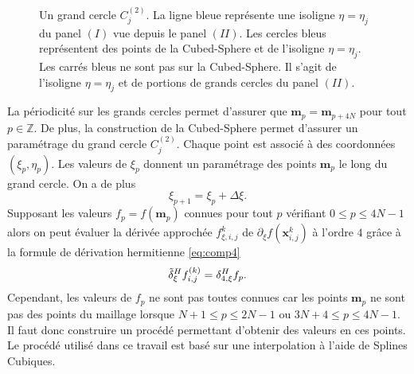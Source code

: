 \begin{figure}[htbp]
\begin{center}
\end{center}
\caption{Un grand cercle $C_j^{(2)}$. La ligne bleue représente une isoligne $\eta=\eta_j$ du panel $(I)$ vue depuis le panel $(II)$. Les cercles bleus représentent des points de la Cubed-Sphere et de l'isoligne $\eta=\eta_j$. Les carrés bleus ne sont pas sur la Cubed-Sphere. Il s'agit de l'isoligne $\eta = \eta_j$ et de portions de grands cercles du panel $(II)$.}
\label{fig: panel II_interp}
\end{figure}  

La périodicité sur les grands cercles permet d'assurer que $\mathbf{m}_p = \mathbf{m}_{p+4N}$ pour tout $p \in \mathbb{Z}$. De plus, la construction de la Cubed-Sphere permet d'assurer un paramétrage du grand cercle $C^{(2)}_j$. Chaque point est associé à des coordonnées $(\xi_p, \eta_p)$. Les valeurs de $\xi_p$ donnent un paramétrage des points $\mathbf{m}_p$ le long du grand cercle. On a de plus
\begin{equation}
\xi_{p+1} = \xi_p + \Delta \xi.
\end{equation}
Supposant les valeurs $f_p = f(\mathbf{m}_p)$ connues pour tout $p$ vérifiant $0 \leq p \leq 4N-1$ alors on peut évaluer la dérivée approchée $f_{\xi,i,j}^k$ de $\partial_{\xi}f(\mathbf{x}_{i,j}^k)$ à l'ordre $4$ grâce à la formule de dérivation hermitienne \eqref{eq:comp4}
\begin{equation}
\tilde{\delta}^H_{\xi} f_{i,j}^{(k)} = \delta_{4,\xi}^H f_p.
\end{equation}
Cependant, les valeurs de $f_p$ ne sont pas toutes connues car les points $\mathbf{m}_p$ ne sont pas des points du maillage lorsque $N+1 \leq p \leq 2N-1$ ou $3N+4 \leq p \leq 4N-1$. Il faut donc construire un procédé permettant d'obtenir des valeurs en ces points. Le procédé utilisé dans ce travail est basé sur une interpolation à l'aide de Splines Cubiques.

